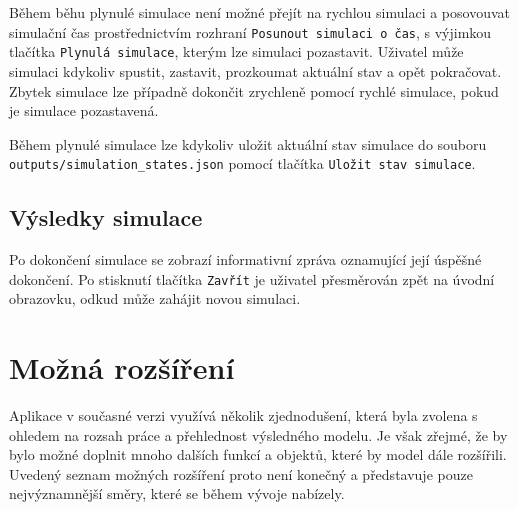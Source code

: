 \documentclass[
  program=itp,
  biblatex,
  figures=false,
  glossaries,
  index
]{kidiplom}
\begin{document}
Během běhu plynulé simulace není možné přejít na rychlou simulaci a posovouvat simulační čas prostřednictvím rozhraní \texttt{Posunout simulaci o čas}, s výjimkou tlačítka \texttt{Plynulá simulace}, kterým lze simulaci pozastavit. Uživatel může simulaci kdykoliv spustit, zastavit, prozkoumat aktuální stav a opět pokračovat. Zbytek simulace lze případně dokončit zrychleně pomocí rychlé simulace, pokud je simulace pozastavená.

Během plynulé simulace lze kdykoliv uložit aktuální stav simulace do souboru \texttt{outputs/simulation\_states.json} pomocí tlačítka \texttt{Uložit stav simulace}.

\subsection{Výsledky simulace}
Po dokončení simulace se zobrazí informativní zpráva oznamující její úspěšné dokončení. Po stisknutí tlačítka \texttt{Zavřít} je uživatel přesměrován zpět na úvodní obrazovku, odkud může zahájit novou simulaci.

\section{Možná rozšíření}
Aplikace v současné verzi využívá několik zjednodušení, která byla zvolena s ohledem na rozsah práce a přehlednost výsledného modelu. Je však zřejmé, že by bylo možné doplnit mnoho dalších funkcí a objektů, které by model dále rozšířili. Uvedený seznam možných rozšíření proto není konečný a představuje pouze nejvýznamnější směry, které se během vývoje nabízely.
\end{document}
